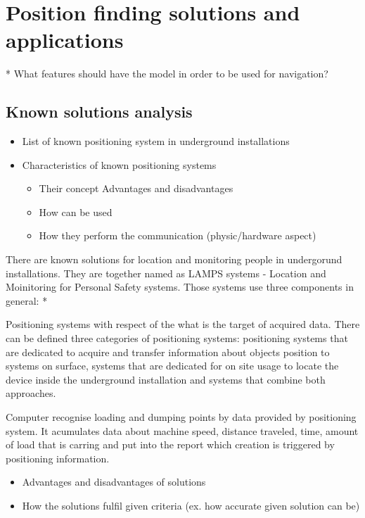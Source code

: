 \documentclass[../main.tex]{subfiles}
\begin{document}
\chapter{Position finding solutions and applications}
* What features should have the model in order to be used for navigation?


\section{Known solutions analysis}
\begin{itemize}
	\item List of known positioning system in underground installations
	\item Characteristics of known positioning systems
	\begin{itemize}
		\item Their concept Advantages and disadvantages
		\item How can be used
		\item How they perform the communication (physic/hardware aspect)
	\end{itemize}
\end{itemize}

There are known solutions for location and monitoring people in undergorund installations. They are together named as LAMPS systems - Location and Moinitoring for Personal Safety systems. Those systems use three components in general:
*


Positioning systems with respect of the what is the target of acquired data. There can be defined three categories of positioning systems: positioning systems that are dedicated to acquire and transfer information about objects position to systems on surface, systems that are dedicated for on site usage to locate the device inside the underground installation and systems that combine both approaches.


Computer recognise loading and dumping points by data provided by positioning system. It acumulates data about machine speed, distance traveled, time, amount of load that is carring and put into the report which creation is triggered by positioning information.


\begin{itemize}
	\item Advantages and disadvantages of solutions
	\item How the solutions fulfil given criteria (ex. how accurate given solution can be)
\end{itemize}
\end{document}
